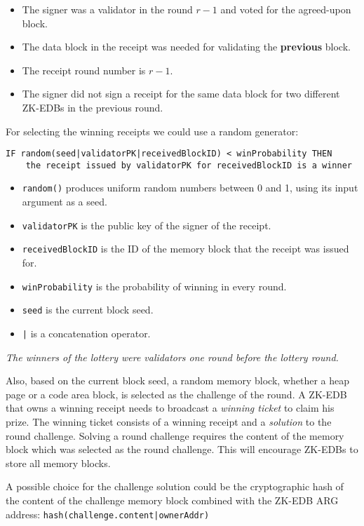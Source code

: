 \documentclass[11pt, A4]{report}
\begin{document}
    \begin{itemize}
        \item The signer was a validator in the round \(r - 1\) and voted for the agreed-upon block.
        \item The data block in the receipt was needed for validating the \textbf{previous} block.
        \item The receipt round number is \(r - 1\).
        \item The signer did not sign a receipt for the same data block for two different ZK-EDBs in the previous round.
    \end{itemize}
    For selecting the winning receipts we could use a random generator:
    \begin{verbatim}
IF random(seed|validatorPK|receivedBlockID) < winProbability THEN
    the receipt issued by validatorPK for receivedBlockID is a winner
    \end{verbatim}
    \begin{itemize}
        \item \texttt{random()} produces uniform random numbers between 0 and 1, using its input argument as a seed.
        \item \texttt{validatorPK} is the public key of the signer of the receipt.
        \item \texttt{receivedBlockID} is the ID of the memory block that the receipt was issued for.
        \item \texttt{winProbability} is the probability of winning in every round.
        \item \texttt{seed} is the current block seed.
        \item \texttt{|} is a concatenation operator.
    \end{itemize}

    \emph{The winners of the lottery were validators one round before the lottery round.}

    Also, based on the current block seed, a random memory block, whether a heap page or a code area block, is
    selected as the challenge of the round. A ZK-EDB that owns a winning receipt needs to broadcast a \emph{winning
    ticket} to claim his prize. The winning ticket consists of a winning receipt and a \emph{solution} to the round
    challenge. Solving a round challenge requires the content of the memory block which was selected as the round
    challenge. This will encourage ZK-EDBs to store all memory blocks.

    A possible choice for the challenge solution could be the cryptographic hash of the content of the challenge
    memory block combined with the ZK-EDB ARG address: \texttt{hash(challenge.content|ownerAddr)}
\end{document}
